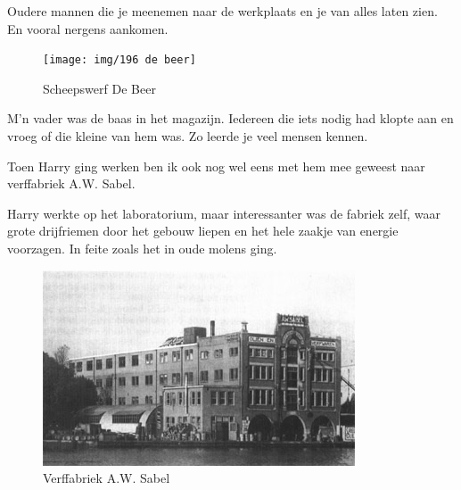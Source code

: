 \documentclass[10pt,twoside, openright]{memoir}
\begin{document}
Oudere mannen die je meenemen naar de werkplaats en je van alles laten zien. En vooral nergens aankomen. 

\begin{figure}
\texttt{[image: img/196 de beer]}
\caption*{\footnotesize Scheepswerf De Beer}
\end{figure}

M’n vader was de baas in het magazijn. Iedereen die iets nodig had klopte aan en vroeg of die kleine van hem was. Zo leerde je veel mensen kennen. 




Toen Harry ging werken ben ik ook nog wel eens met hem mee geweest naar verffabriek A.W. Sabel. 

Harry werkte op het laboratorium, maar interessanter was de fabriek zelf, waar grote drijfriemen door het gebouw liepen en het hele zaakje van energie voorzagen. In feite zoals het in oude molens ging.

\begin{figure}
\includegraphics[width=\textwidth]{img/ch32/sabel}
\caption*{\footnotesize Verffabriek A.W. Sabel}
\end{figure}
\end{document}
